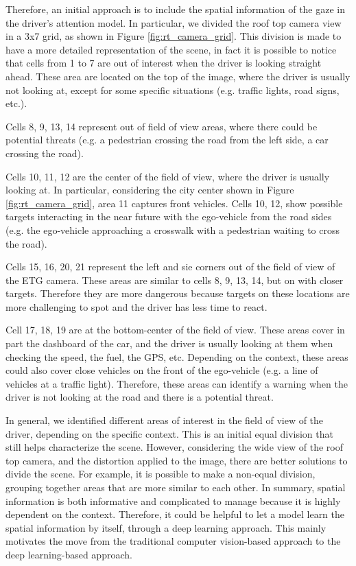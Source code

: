 Therefore, an initial approach is to include the spatial information of the 
gaze in the driver's attention model. In particular, we divided the roof top 
camera view in a 3x7 grid, as shown in Figure \ref{fig:rt_camera_grid}. 
This division is made to have a more detailed representation of the scene, in 
fact it is possible to notice that cells from  1 to 7 are out of interest when 
the driver is looking straight ahead. These area are 
located on the top of the image, where the driver is usually not looking at, 
except for some specific situations (e.g. traffic lights, road signs, etc.). 

Cells 8, 9, 13, 14 represent out of field of view areas, where there could be 
potential threats (e.g. a pedestrian crossing the road from the left side, 
a car crossing the road). 

Cells 10, 11, 12 are the center of the field of view, 
where the driver is usually looking at. In particular, considering the city 
center shown in Figure \ref{fig:rt_camera_grid}, area 11 captures front 
vehicles. 
Cells 10, 12, show possible targets interacting 
in the near future with the ego-vehicle 
from the road sides (e.g. the ego-vehicle approaching a crosswalk with a 
pedestrian waiting to cross the road).

Cells 15, 16, 20, 21 represent the left and sie corners out of the field of view 
of the ETG camera. These areas are similar to cells 8, 9, 13, 14, but on with 
closer targets. Therefore they are more dangerous because targets on these 
locations are more challenging to spot and the driver has less time to react.

Cell 17, 18, 19 are at the bottom-center of the field of view.
These areas cover in part the dashboard of the car, and the driver is usually 
looking at them when checking the speed, the fuel, the GPS, etc. 
Depending on the context, these areas could also cover close vehicles on the 
front of the ego-vehicle (e.g. a line of vehicles at a traffic light). 
Therefore, these areas can identify a warning when the driver is not 
looking at the road and there is a potential threat.

In general, we identified different areas of interest in the field of view of 
the driver, depending on the specific context. This is an initial equal division 
that still helps characterize the scene. However, considering the wide view of 
the roof top camera, and the distortion applied to the image, there are better 
solutions to divide the scene. For example, it is possible to make a non-equal 
division, grouping together areas that are more similar to each other.
In summary, spatial information is both informative and complicated to manage 
because it is highly dependent on the context. Therefore, it could be helpful 
to let a model learn the spatial information by itself, through a deep learning 
approach. This mainly motivates the move from the traditional computer 
vision-based approach to the deep learning-based approach.
 
